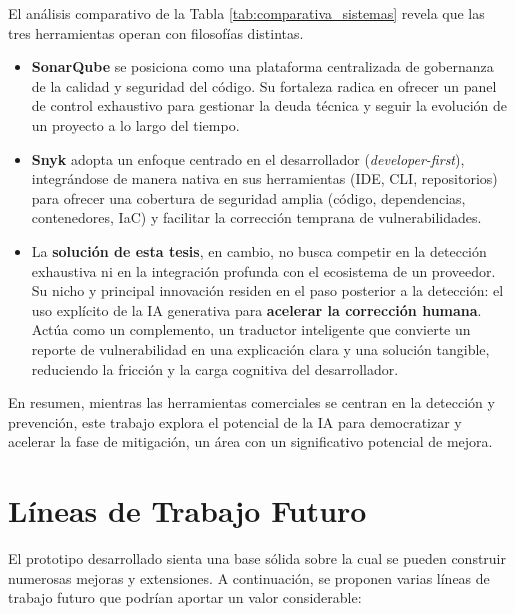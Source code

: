 El análisis comparativo de la Tabla \ref{tab:comparativa_sistemas} revela que las tres herramientas operan con filosofías distintas. 
\begin{itemize}
    \item \textbf{SonarQube} se posiciona como una plataforma centralizada de gobernanza de la calidad y seguridad del código. Su fortaleza radica en ofrecer un panel de control exhaustivo para gestionar la deuda técnica y seguir la evolución de un proyecto a lo largo del tiempo.
    \item \textbf{Snyk} adopta un enfoque centrado en el desarrollador (\textit{developer-first}), integrándose de manera nativa en sus herramientas (IDE, CLI, repositorios) para ofrecer una cobertura de seguridad amplia (código, dependencias, contenedores, IaC) y facilitar la corrección temprana de vulnerabilidades.
    \item La \textbf{solución de esta tesis}, en cambio, no busca competir en la detección exhaustiva ni en la integración profunda con el ecosistema de un proveedor. Su nicho y principal innovación residen en el paso posterior a la detección: el uso explícito de la IA generativa para \textbf{acelerar la corrección humana}. Actúa como un complemento, un traductor inteligente que convierte un reporte de vulnerabilidad en una explicación clara y una solución tangible, reduciendo la fricción y la carga cognitiva del desarrollador.
\end{itemize}

En resumen, mientras las herramientas comerciales se centran en la detección y prevención, este trabajo explora el potencial de la IA para democratizar y acelerar la fase de mitigación, un área con un significativo potencial de mejora.

\section{Líneas de Trabajo Futuro}\label{sec:trabajofuturo}

El prototipo desarrollado sienta una base sólida sobre la cual se pueden construir numerosas mejoras y extensiones. A continuación, se proponen varias líneas de trabajo futuro que podrían aportar un valor considerable:

